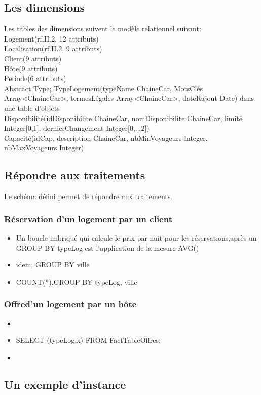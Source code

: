 \documentclass[11pt]{article}
\begin{document}
\subsection{Les dimensions}
Les tables des dimensions suivent le modèle relationnel suivant:\\
Logement(rf.II.2, 12 attributs)\\
Localisation(rf.II.2, 9 attributs)\\
Client(9 attributs)\\
Hôte(9 attributs)\\
Periode(6 attributs)\\
Abstract Type;
TypeLogement(typeName ChaineCar, MotsClés Array<ChaineCar>, termesLégales Array<ChaineCar>, dateRajout Date) dans une table d'objets\\
Disponibilité(idDisponibilite ChaineCar, nomDisponibilite ChaineCar, limité Integer[0,1], dernierChangement Integer[0,..,2])\\
Capacité(idCap, description ChaineCar, nbMinVoyageurs Integer, nbMaxVoyageurs Integer)

\subsection{Répondre aux traitements}
Le schéma défini permet de répondre aux traitements.
\subsubsection*{Réservation d'un logement par un client}
\begin{itemize}
	\item Un boucle imbriqué qui calcule le prix par nuit pour les réservations,après un GROUP BY typeLog est l'application de la mesure AVG()
	\item idem, GROUP BY ville
	\item COUNT(*),GROUP BY typeLog, ville
\end{itemize}
\subsubsection*{Offred'un logement par un hôte}
\begin{itemize}
	\item 
	\item SELECT (typeLog,x) FROM FactTableOffres;
	\item 
\end{itemize}

\subsection{Un exemple d'instance}

\end{document}
